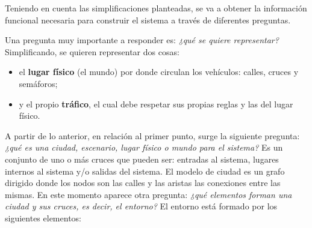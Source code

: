 Teniendo en cuenta las simplificaciones planteadas, se va a obtener la información funcional necesaria para construir el sistema a través de diferentes preguntas.

Una pregunta muy importante a responder es: \textit{¿qué se quiere representar?} Simplificando, se quieren representar dos cosas:
\begin{itemize}
    \item el \textbf{lugar físico} (el mundo) por donde circulan los vehículos: calles, cruces y semáforos;
    \item y el propio \textbf{tráfico}, el cual debe respetar sus propias reglas y las del lugar físico.
\end{itemize}

A partir de lo anterior, en relación al primer punto, surge la siguiente pregunta: \textit{¿qué es una ciudad, escenario, lugar físico o mundo para el sistema?} Es un conjunto de uno o más cruces que pueden ser: entradas al sistema, lugares internos al sistema y/o salidas del sistema. El modelo de ciudad es un grafo dirigido donde los nodos son las calles y las aristas las conexiones entre las mismas. En este momento aparece otra pregunta: \textit{¿qué elementos forman una ciudad y sus cruces, es decir, el entorno?} El entorno está formado por los siguientes elementos:
